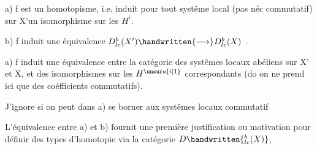 a) f est un homotopisme, i.e. induit pour tout systême local (pas
néc commutatif) sur X'un isomorphisme sur les $H^{i}$.

b)  f induit une équivalence $D^{b}_{lc}(X')\handwritten{\longrightarrow} D^{b}_{lc}(X)$ .

a) f induit une équivalence entre la catégorie des systêmes locaux
abéliens sur X' et X, et des isomorphismes sur les $H^{\unsure{i|1}}$ correspondants (do
on ne prend ici que des coéfficients commutatifs).

 J'ignore si on peut dans a) se borner aux systêmes locaux commutatif

L'équivalence entre a) et b) fournit une première justification ou
motivation pour définir des types d'homotopie via la catégorie $D\handwritten{^{b}_{lc}(X)}$,

